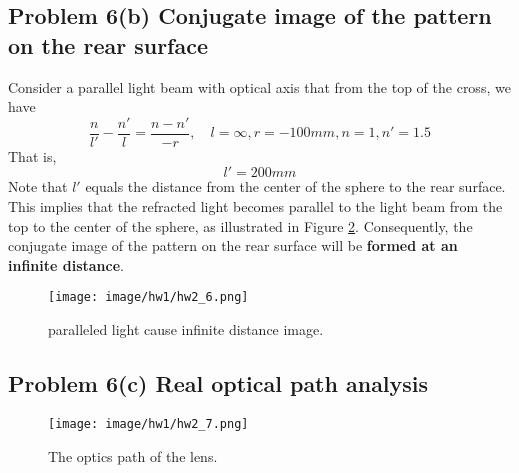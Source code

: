 \documentclass{article}
\begin{document}
\subsection{Problem 6(b) Conjugate image of the pattern on the rear surface}

Consider a parallel light beam with optical axis that from the top of the cross, we have
\begin{equation}
    \frac{n}{l'}-\frac{n'}{l}=\frac{n-n'}{-r},\quad l=\infty, r=-100mm, n=1, n'=1.5
\end{equation}
That is,
\begin{equation}
    l' = 200mm
\end{equation}
Note that $l'$ equals the distance from the center of the sphere to the rear surface. This implies that the refracted light becomes parallel to the light beam from the top to the center of the sphere, as illustrated in Figure \ref{fig:hw1_6}. Consequently, the conjugate image of the pattern on the rear surface will be \textbf{formed at an infinite distance}.
\begin{figure}[H]
    \centering
    \texttt{[image: image/hw1/hw2\_6.png]}
    \caption{paralleled light cause infinite distance image.}
    \label{fig:hw1_6}
\end{figure}

\subsection{Problem 6(c) Real optical path analysis}

\begin{figure}[H]
    \centering
    \texttt{[image: image/hw1/hw2\_7.png]}
    \caption{The optics path of the lens.}
    \label{fig:hw1_6}
\end{figure}
\end{document}
